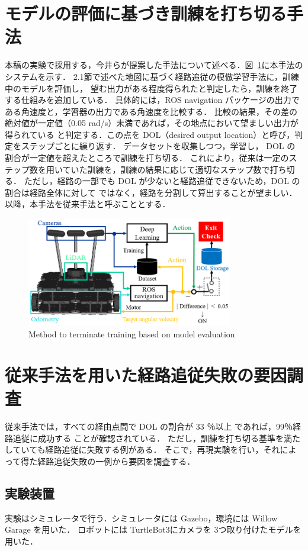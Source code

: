 \documentclass{jarticle}
\renewcommand{\figurename}{図~}
\newcommand{\figref}[1]{\figurename\ref{#1}}
\begin{document}
\section{モデルの評価に基づき訓練を打ち切る手法}
本稿の実験で採用する，今井らが提案した手法について述べる．\figref{fig:5}に本手法のシステムを示す．
2.1節で述べた地図に基づく経路追従の模倣学習手法に，訓練中のモデルを評価し，
望む出力がある程度得られたと判定したら，訓練を終了する仕組みを追加している．
具体的には，ROS navigation パッケージの出力である角速度と，学習器の出力である角速度を比較する．
比較の結果，その差の絶対値が一定値（0.05 rad/s）未満であれば，その地点において望ましい出力が得られている
と判定する．この点を DOL（desired output location）と呼び，判定をステップごとに繰り返す．
データセットを収集しつつ，学習し， DOL の割合が一定値を超えたところで訓練を打ち切る．
これにより，従来は一定のステップ数を用いていた訓練を，訓練の結果に応じて適切なステップ数で打ち切る．
ただし，経路の一部でも DOL が少ないと経路追従できないため，DOL の割合は経路全体に対して
ではなく，経路を分割して算出することが望ましい．
以降，本手法を従来手法と呼ぶこととする．

\begin{figure}[h!]
  \centering
   \includegraphics[height=48mm]{./png/moderu.png}
   \caption{Method to terminate training based on model evaluation}
   \label{fig:5}
\end{figure}

\section{従来手法を用いた経路追従失敗の要因調査}
従来手法では，すべての経由点間で DOL の割合が 33 ％以上 であれば，99％経路追従に成功する
ことが確認されている\cite{imai2}．
ただし，訓練を打ち切る基準を満たしていても経路追従に失敗する例がある．
そこで，再現実験を行い，それによって得た経路追従失敗の一例から要因を調査する．

\subsection{実験装置}
実験はシミュレータで行う．シミュレータには Gazebo\cite{gazebo}，環境には Willow Garage を用いた．
ロボットには TurtleBot3\cite{TurtleBot3}にカメラを 3つ取り付けたモデルを用いた．
\end{document}
